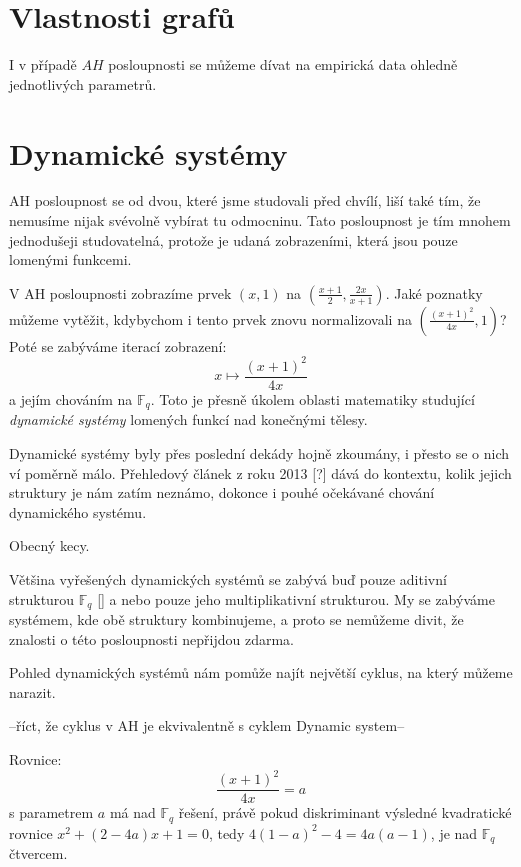\documentclass[12pt]{report}
\begin{document}
\section{Vlastnosti grafů}

I v případě $AH$ posloupnosti se můžeme dívat na empirická data ohledně jednotlivých parametrů.


\section{Dynamické systémy}

AH posloupnost se od dvou, které jsme studovali před chvílí, liší také tím, že nemusíme nijak svévolně vybírat tu  odmocninu. Tato posloupnost je tím mnohem jednodušeji studovatelná, protože je udaná zobrazeními, která jsou pouze lomenými funkcemi. 
  
V AH posloupnosti zobrazíme prvek $(x,1)$ na $\left(\frac{x+1}{2}, \frac{2x}{x+1}\right)$. Jaké poznatky můžeme vytěžit, kdybychom i tento prvek znovu normalizovali na $\left ( \frac{(x+1)^2}{4x}, 1 \right)$? Poté se zabýváme iterací zobrazení:
$$x \longmapsto \frac{(x+1)^2}{4x}$$
a jejím chováním na $\mathbb{F}_q$. Toto je přesně úkolem oblasti matematiky studující \textit{dynamické systémy} lomených funkcí nad konečnými tělesy.

Dynamické systémy byly přes poslední dekády hojně zkoumány, i přesto se o nich ví poměrně málo. Přehledový článek z roku 2013 [?] dává do kontextu, kolik jejich struktury je nám zatím neznámo, dokonce i pouhé očekávané chování dynamického systému. 




Obecný kecy.

Většina vyřešených dynamických systémů se zabývá buď pouze aditivní strukturou $\mathbb{F}_q$ [] a nebo pouze jeho multiplikativní strukturou. My se zabýváme systémem, kde obě struktury kombinujeme, a proto se nemůžeme divit, že znalosti o této posloupnosti nepřijdou zdarma.

Pohled dynamických systémů nám pomůže najít největší cyklus, na který můžeme narazit.

--říct, že cyklus v AH je ekvivalentně s cyklem Dynamic system--

Rovnice: $$\frac{(x+1)^2}{4x} = a$$ s parametrem $a$ má nad $\mathbb{F}_q$ řešení, právě pokud diskriminant výsledné kvadratické rovnice $x^2 + (2-4a)x+1=0$, tedy $4(1-a)^2-4 = 4a(a-1)$, je nad $\mathbb{F}_q$ čtvercem.
\end{document}
